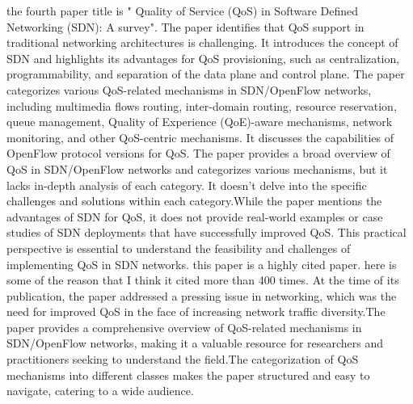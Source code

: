 \documentclass{article}
\begin{document}
\begin{tex}
the fourth paper title is " Quality of Service (QoS) in Software Defined Networking (SDN): A survey"\cite{karakus2017quality}. The paper identifies that QoS support in traditional networking architectures is challenging. It introduces the concept of SDN and highlights its advantages for QoS provisioning, such as centralization, programmability, and separation of the data plane and control plane. The paper categorizes various QoS-related mechanisms in SDN/OpenFlow networks, including multimedia flows routing, inter-domain routing, resource reservation, queue management, Quality of Experience (QoE)-aware mechanisms, network monitoring, and other QoS-centric mechanisms. It discusses the capabilities of OpenFlow protocol versions for QoS. The paper provides a broad overview of QoS in SDN/OpenFlow networks and categorizes various mechanisms, but it lacks in-depth analysis of each category. It doesn't delve into the specific challenges and solutions within each category.While the paper mentions the advantages of SDN for QoS, it does not provide real-world examples or case studies of SDN deployments that have successfully improved QoS. This practical perspective is essential to understand the feasibility and challenges of implementing QoS in SDN networks.
this paper is a highly cited paper. here is some of the reason that I think it cited more than 400 times. At the time of its publication, the paper addressed a pressing issue in networking, which was the need for improved QoS in the face of increasing network traffic diversity.The paper provides a comprehensive overview of QoS-related mechanisms in SDN/OpenFlow networks, making it a valuable resource for researchers and practitioners seeking to understand the field.The categorization of QoS mechanisms into different classes makes the paper structured and easy to navigate, catering to a wide audience.


\end{tex}
\end{document}
